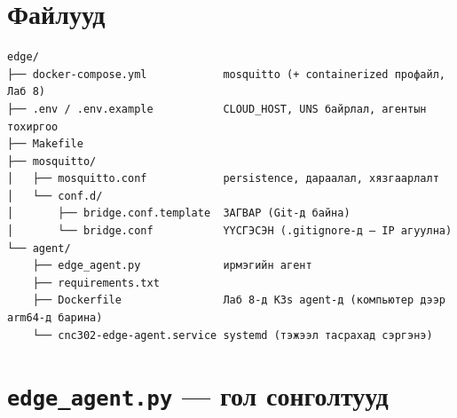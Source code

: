 \hypertarget{ux444ux430ux439ux43bux443ux443ux434}{%
\section{Файлууд}\label{ux444ux430ux439ux43bux443ux443ux434}}

\begin{verbatim}
edge/
├── docker-compose.yml            mosquitto (+ containerized профайл, Лаб 8)
├── .env / .env.example           CLOUD_HOST, UNS байрлал, агентын тохиргоо
├── Makefile
├── mosquitto/
│   ├── mosquitto.conf            persistence, дараалал, хязгаарлалт
│   └── conf.d/
│       ├── bridge.conf.template  ЗАГВАР (Git-д байна)
│       └── bridge.conf           ҮҮСГЭСЭН (.gitignore-д — IP агуулна)
└── agent/
    ├── edge_agent.py             ирмэгийн агент
    ├── requirements.txt
    ├── Dockerfile                Лаб 8-д K3s agent-д (компьютер дээр arm64-д барина)
    └── cnc302-edge-agent.service systemd (тэжээл тасрахад сэргэнэ)
\end{verbatim}

\hypertarget{edge_agent.py-ux433ux43eux43b-ux441ux43eux43dux433ux43eux43bux442ux443ux443ux434}{%
\section{\texorpdfstring{\texttt{edge\_agent.py} --- гол сонголтууд}{edge\_agent.py --- гол сонголтууд}}\label{edge_agent.py-ux433ux43eux43b-ux441ux43eux43dux433ux43eux43bux442ux443ux443ux434}}

\begin{Shaded}
\begin{Highlighting}[]
\end{Highlighting}
\end{Shaded}

